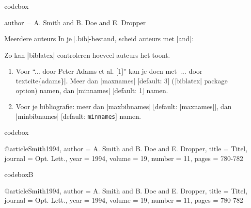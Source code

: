 
\begin{saveblock}{codebox}%
	\begin{highlightblock}
		author = {A. Smith and B. Doe and E. Dropper}
	\end{highlightblock}
\end{saveblock}



\begin{frame}{Meerdere auteurs}
	In je \hll|.bib|-bestand, scheid auteurs met \hll|and|:
	\par\medskip{}
	
	\medskip
	Zo kan \hll|biblatex| controleren hoeveel auteurs het toont.
	\begin{enumerate}
		\item Voor ``... door Peter Adams et al. [1]'' kan je doen met \hll|... door \\textcite\{adams\}|.
		Meer dan \hll|maxnames| [default: 3] (\hll|biblatex| package option) namen, dan
		\hll|minnames| [default: 1] namen.
		\item Voor je bibliografie: meer dan \hll|maxbibnames| [default: \hll|maxnames|], dan
		\hll|minbibnames| [default: \lstinline|minnames|] namen.
	\end{enumerate}

\end{frame}



\begin{saveblock}{codebox}%
	\begin{highlightblock}
		@article{Smith1994,
			author = {A. Smith and B. Doe and E. Dropper},
			title = {Titel},
			journal = {Opt. Lett.},
			year = 1994,
			volume = 19,
			number = 11,
			pages = {780-782}
		}
	\end{highlightblock}
\end{saveblock}


\begin{saveblock}{codeboxB}%
	\begin{highlightblock}
		@article{Smith1994,
			author = {A. Smith and B. Doe and E. Dropper},
			title = {Titel},
			journal = {Opt. Lett.},
			year = 1994,
			volume = 19,
			number = 11,
			pages = {780-782}
		}
	\end{highlightblock}
\end{saveblock}

